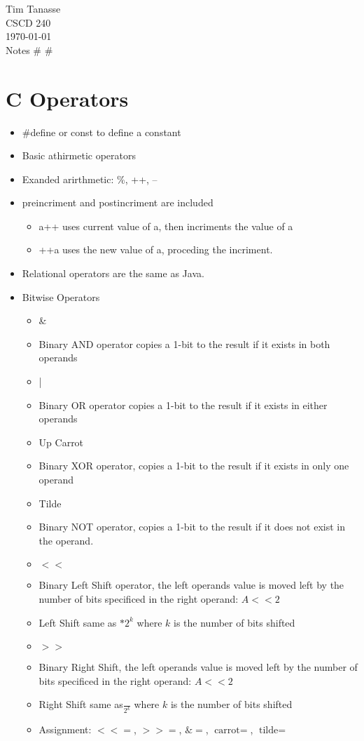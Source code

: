 \documentclass{article}
\begin{document}
\begin{flushright}
  Tim Tanasse\\
  CSCD 240\\
  \today \\
  Notes \# \# \\
\end{flushright}
\section*{C Operators}
\begin{itemize}
  \item \#define or const to define a constant
  \item Basic athirmetic operators
  \item Exanded arirthmetic: \%, ++, --
  \item preincriment and postincriment are included
  \begin{itemize}
    \item a++ uses current value of a, then incriments the value of a
    \item ++a uses the new value of a, proceding the incriment.
  \end{itemize}
  \item Relational operators are the same as Java.
  \item Bitwise Operators
  \begin{itemize}
    \item \&
    \item Binary AND operator copies a 1-bit to the result if it exists in both operands
    \item |
    \item Binary OR operator copies a 1-bit to the result if it exists in either operands
    \item Up Carrot
    \item Binary XOR operator, copies a 1-bit to the result if it exists in only one operand
    \item Tilde
    \item Binary NOT operator, copies a 1-bit to the result if it does not exist in the operand.
    \item $<<$
    \item Binary Left Shift operator, the left operands value is moved left by the number of bits specificed in the right operand: $A<<2$
    \item Left Shift same as $*2^k$ where $k$ is the number of bits shifted
    \item $>>$
    \item Binary Right Shift, the left operands value is moved left by the number of bits specificed in the right operand: $A<<2$
    \item Right Shift same as$\frac{}{2^k}$ where $k$ is the number of bits shifted
    \item Assignment: $<<=$, $>>=$, $\&=$, $\text{carrot}=$, $\text{tilde}=$
  \end{itemize}
\end{itemize}
\end{document}
